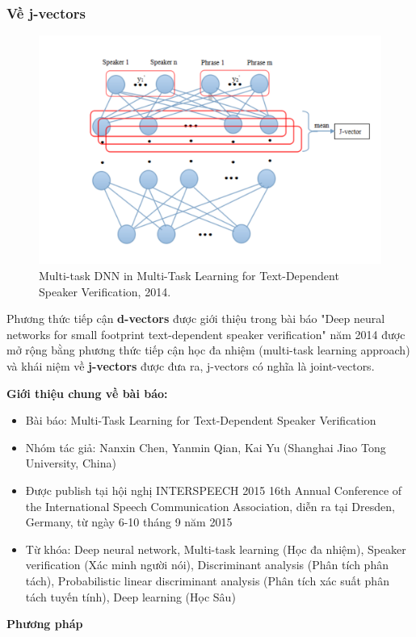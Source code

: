\documentclass{article}
\begin{document}
	\subsubsection{Về j-vectors}
	\begin{figure}[H]
		\centering
		\includegraphics[width=0.75\linewidth]{images/j-vectors.png}
		\caption{Multi-task DNN in Multi-Task Learning for Text-Dependent Speaker Verification, 2014.}
		\label{fig:writing-thesis}
	\end{figure}
	\qquad Phương thức tiếp cận \textbf{d-vectors} được giới thiệu trong bài báo "Deep neural networks for small footprint text-dependent speaker verification" năm 2014 được mở rộng bằng phương thức tiếp cận học đa nhiệm (multi-task learning approach) và khái niệm về \textbf{j-vectors} được đưa ra, j-vectors có nghĩa là joint-vectors.
	
	\textbf{Giới thiệu chung về bài báo:}
	\begin{itemize}
		\item Bài báo: Multi-Task Learning for Text-Dependent Speaker Verification
		\item Nhóm tác giả: Nanxin Chen, Yanmin Qian, Kai Yu (Shanghai Jiao Tong University, China)
		\item Được publish tại hội nghị INTERSPEECH 2015 16th Annual Conference of the International Speech Communication Association, diễn ra tại Dresden, Germany, từ ngày 6-10 tháng 9 năm 2015
		\item Từ khóa: Deep neural network, Multi-task learning (Học đa nhiệm), Speaker verification (Xác minh người nói), Discriminant analysis (Phân tích phân tách), Probabilistic linear discriminant analysis (Phân tích xác suất phân tách tuyến tính), Deep learning (Học Sâu)
	\end{itemize}

	\textbf{Phương pháp}
	
\end{document}
